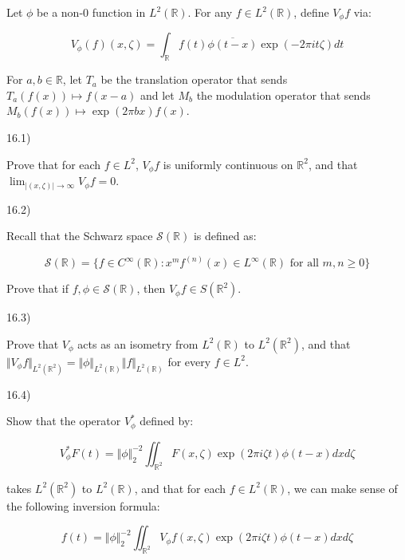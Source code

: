 \documentclass[10pt]{article}
\newenvironment{problem}[2][]{\begin{trivlist}
\item[\hskip \labelsep {\bfseries #1}\hskip \labelsep {\bfseries #2.}]}{\end{trivlist}}
\begin{document}
\begin{problem}{Question 16}

Let $\phi$ be a non-0 function in $L^2(\mathbb{R})$. For any $f \in L^2(\mathbb{R})$, define $V_\phi f$ via:

$$ V_\phi(f)(x, \zeta) = \int_{\mathbb{R}} f(t) \overline{\phi(t-x)} \exp(-2 \pi i t \zeta) dt $$

For $a, b \in \mathbb{R}$, let $T_a$ be the translation operator that sends $T_a(f(x)) \mapsto f(x -a )$ and let $M_b$ the modulation operator that sends $M_b(f(x)) \mapsto \exp(2 \pi bx)f(x)$.

16.1)

Prove that for each $f\in L^2$, $V_\phi f$ is uniformly continuous on $\mathbb{R}^2$, and that $\lim_{|(x, \zeta)| \to \infty} V_\phi f = 0$.

16.2)

Recall that the Schwarz space $\mathcal{S}(\mathbb{R})$ is defined as:

$$ \mathcal{S}(\mathbb{R}) = \{ f \in C^\infty(\mathbb{R}) : x^m f^{(n)}(x) \in L^\infty(\mathbb{R}) \text{ for all } m, n \geq 0 \}$$

Prove that if $f, \phi \in \mathcal{S}(\mathbb{R})$, then $V_\phi f \in S(\mathbb{R}^2)$.

16.3)

Prove that $V_\phi$ acts as an isometry from $L^2(\mathbb{R})$ to $L^2(\mathbb{R}^2)$, and that $\Vert V_\phi f \Vert_{L^2(\mathbb{R}^2)} = \Vert \phi \Vert_{L^2(\mathbb{R})} \Vert f \Vert_{L^2(\mathbb{R})}$ for every $f \in L^2$.

16.4)

Show that the operator $V_\phi^*$ defined by:

$$ V_\phi^* F(t) = \Vert \phi\Vert_2^{-2} \iint_{\mathbb{R}^2} F(x, \zeta) \exp(2\pi i \zeta t) \phi(t - x) dx d\zeta $$

takes $L^2(\mathbb{R}^2)$ to $L^2(\mathbb{R})$, and that for each $f \in L^2(\mathbb{R})$, we can make sense of the following inversion formula:

$$ f(t) = \Vert \phi \Vert_2^{-2} \iint_{\mathbb{R}^2} V_\phi f(x, \zeta) \exp(2 \pi i \zeta t) \phi(t - x) dx d\zeta $$

\end{problem}
\end{document}
